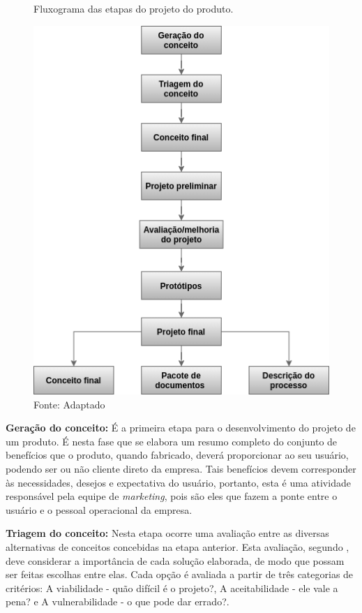\begin{figure}[H]
  \centering
  \caption{Fluxograma das etapas do projeto do produto.}
  \includegraphics[width=1\textwidth]{images/projeto_produto.png}
  \caption*{Fonte: Adaptado \cite{slack2006administracao} }
  \label{fig:projeto_produto}
\end{figure}

\textbf{Geração do conceito:} É a primeira etapa para o desenvolvimento do projeto de um produto. É nesta fase que se elabora um resumo completo do conjunto de benefícios que o produto, quando fabricado, deverá proporcionar ao seu usuário, podendo ser ou não cliente direto da empresa. Tais benefícios devem corresponder às necessidades, desejos e expectativa do usuário, portanto, esta é uma atividade responsável pela equipe de \textit{marketing}, pois são eles que fazem a ponte entre o usuário e o pessoal operacional da empresa.  

\textbf{Triagem do conceito:} Nesta etapa ocorre uma avaliação entre as diversas alternativas de conceitos concebidas na etapa anterior. Esta avaliação, segundo \cite{slack2006administracao}, deve considerar a importância de cada solução elaborada, de modo que possam ser feitas escolhas entre elas. Cada opção é avaliada a partir de três categorias de critérios: A viabilidade - quão difícil é o projeto?, A aceitabilidade - ele vale a pena? e A vulnerabilidade - o que pode dar errado?.


